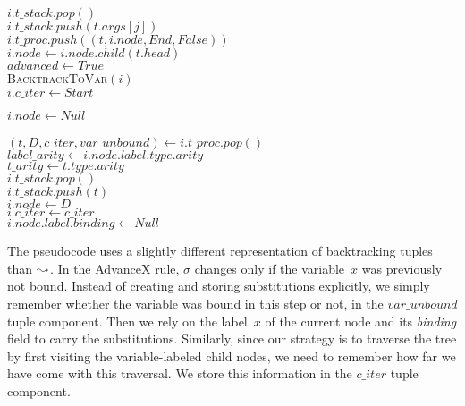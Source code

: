 \begin{quotex}
  \qqq $i.\mathit{t\_stack}.\mathit{pop}()$ \\
  \qqq {}
  \qqqq $i.\mathit{t\_stack}.\mathit{push}(t.\mathit{args}[j])$ \\
  \qqq $i.\mathit{t\_proc}.\mathit{push}
              ( (t, i.\mathit{node}, \mathit{End}, \mathit{False}) )$ \\
  \qqq $\mathit{i.\mathit{node}} \gets i.\mathit{node}.\mathit{child}(t.\mathit{head})$ \\
  \qqq $\mathit{advanced} \gets \mathit{True}$
  \\[\jot]
  \qq {}
  \qqq \textsc{BacktrackToVar}$(i)$ \\
  \qq \MyElse
  \qqq $i.\mathit{c\_iter} \gets \textit{Start}$
  
  \jot
  
  \q \MyForever
  \qq {}
  \qqq $i.\mathit{node} \gets \mathit{Null}$ \\
  \qqq \MyReturn \\
  \qq \MyElse
  \qqq $(t, D, \mathit{c\_iter}, \mathit{var\_unbound}) \gets i.\mathit{t\_proc}.\mathit{pop}()$ \\
  \qqq $\mathit{label\_arity} \gets i.\mathit{node}.\mathit{label}.\mathit{type}.\mathit{arity}$ \\
  \qqq $\mathit{t\_arity} \gets t.\mathit{type}.\mathit{arity}$
  \\[\jot]
  \qqq {}
  \qqqq $i.\mathit{t\_stack}.\mathit{pop}()$
  \\[\jot]
  \qqq $i.\mathit{t\_stack}.\mathit{push}(t)$ \\
  \qqq $i.\mathit{node} \gets D$ \\
  \qqq $i.\mathit{c\_iter} \gets \mathit{c\_iter}$
  \\[\jot]
  \qqq {}
  \qqqq $i.\mathit{node}.\mathit{label}.\mathit{binding} \gets \mathit{Null}$
  \\[\jot]
  \qqq {}
  \qqqq \MyReturn
  \end{quotex}
  
The pseudocode uses a slightly different representation of backtracking tuples
than ${\leadsto}$. In the \textsf{AdvanceX} rule,
$\sigma$ changes only if the variable~$x$ was previously not bound.
Instead of creating and storing substitutions explicitly, we simply remember
whether the variable was bound in this step or not, in the
$\mathit{var\_unbound}$ tuple component. Then we rely on the label~$x$ of the
current node and its \textit{binding} field to carry the substitutions.
Similarly, since our strategy is to traverse the tree by first visiting the
variable-labeled child nodes, we need to remember how far we have come with
this traversal. We store this information in the $\mathit{c\_iter}$ tuple
component.

